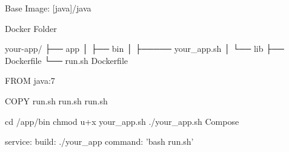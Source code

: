 Base Image: [java]/java

Docker Folder

your-app/
├── app
│   ├── bin
│   ├───── your_app.sh
│   └── lib
├── Dockerfile
└── run.sh
Dockerfile

FROM java:7

COPY run.sh run.sh
run.sh

cd /app/bin
chmod u+x your_app.sh
./your_app.sh
Compose

 service:
  build: ./your_app
  command: 'bash run.sh'
















